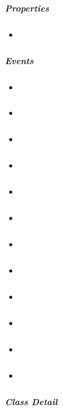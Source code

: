 \documentclass[letterpaper,10pt,english]{sphinxmanual}
\begin{document}
\subparagraph{Properties}
\label{api/component/dd/ddm:properties}\begin{itemize}
\item {}
{\hyperref[api/component/dd/ddm:DDM.bufferTimer]{}}

\end{itemize}


\subparagraph{Events}
\label{api/component/dd/ddm:events}\begin{itemize}
\item {}
{\hyperref[api/component/dd/ddm:DDM.dragstart]{}}

\item {}
{\hyperref[api/component/dd/ddm:DDM.drag]{}}

\item {}
{\hyperref[api/component/dd/ddm:DDM.dragend]{}}

\item {}
{\hyperref[api/component/dd/ddm:DDM.dragenter]{}}

\item {}
{\hyperref[api/component/dd/ddm:DDM.dragover]{}}

\item {}
{\hyperref[api/component/dd/ddm:DDM.dragexit]{}}

\item {}
{\hyperref[api/component/dd/ddm:DDM.dragdrophit]{}}

\item {}
{\hyperref[api/component/dd/ddm:DDM.dragdropmiss]{}}

\item {}
{\hyperref[api/component/dd/ddm:DDM.dropenter]{}}

\item {}
{\hyperref[api/component/dd/ddm:DDM.dropover]{}}

\item {}
{\hyperref[api/component/dd/ddm:DDM.dropexit]{}}

\item {}
{\hyperref[api/component/dd/ddm:DDM.drophit]{}}

\end{itemize}


\subparagraph{Class Detail}
\label{api/component/dd/ddm:class-detail}
\end{document}
